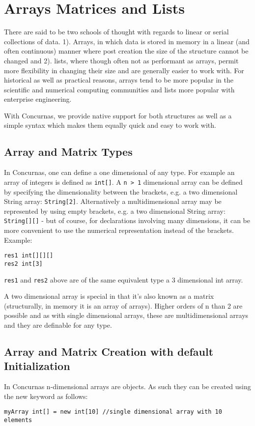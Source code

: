 \documentclass[conc-doc]{subfiles}
\begin{document}
	
	\chapter[Arrays Matrices and Lists]{Arrays Matrices and Lists}
	\label{ch:arrays}
There are said to be two schools of thought with regards to linear or serial collections of data. 1). Arrays, in which data is stored in memory in a linear (and often continuous) manner where post creation the size of the structure cannot be changed and 2). lists, where though often not as performant as arrays, permit more flexibility in changing their size and are generally easier to work with. For historical as well as practical reasons, arrays tend to be more popular in the scientific and numerical computing communities and lists more popular with enterprise engineering.

With Concurnas, we provide native support for both structures as well as a simple syntax which makes them equally quick and easy to work with.

\section{Array and Matrix Types}
In Concurnas, one can define a one dimensional of any type. For example an array of integers is defined as \lstinline{int[]}. A \lstinline{n > 1} dimensional array can be defined by specifying the dimensionality between the brackets, e.g. a two dimensional String array: \lstinline{String[2]}. Alternatively a multidimensional array may be represented by using empty brackets, e.g. a two dimensional String array: \lstinline{String[][]} - but of course, for declarations involving many dimensions, it can be more convenient to use the numerical representation instead of the brackets.  Example:

\begin{lstlisting}
res1 int[][][]
res2 int[3]
\end{lstlisting}

\lstinline{res1} and \lstinline{res2} above are of the same equivalent type a 3 dimensional int array.

A two dimensional array is special in that it's also known as a matrix (structurally, in memory it is an array of arrays). Higher orders of n than 2 are possible and as with single dimensional arrays, these are multidimensional arrays and they are definable for any type.

\section{Array and Matrix Creation with default Initialization}
In Concurnas n-dimensional arrays are objects. As such they can be created using the new keyword as follows:
\begin{lstlisting}
myArray int[] = new int[10] //single dimensional array with 10 elements
\end{lstlisting}
\end{document}
